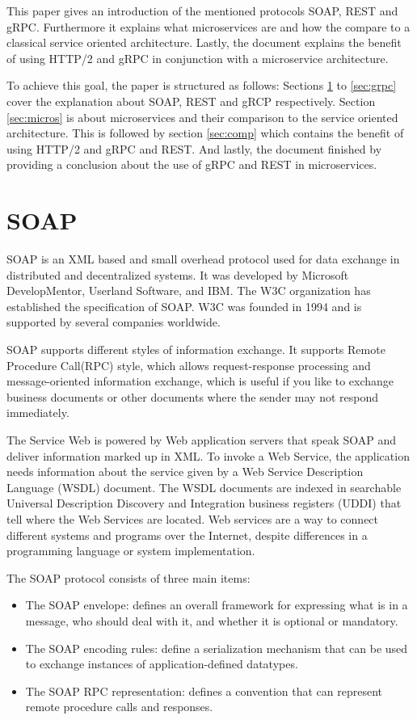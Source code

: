 \documentclass[conference]{IEEEtran}
\begin{document}
This paper gives an introduction of the mentioned protocols SOAP, REST and gRPC. Furthermore it explains what microservices are and how the compare to a classical service oriented architecture. Lastly, the document explains the benefit of using HTTP/2 and gRPC in conjunction with a microservice architecture.

To achieve this goal, the paper is structured as follows: Sections \ref{sec:soap} to \ref{sec:grpc} cover the explanation about SOAP, REST and gRCP respectively. Section \ref{sec:micros} is about microservices and their comparison to the service oriented architecture. This is followed by section \ref{sec:comp} which contains the benefit of using HTTP/2 and gRPC and REST. And lastly, the document finished by providing a conclusion about the use of gRPC and REST in microservices.

\section{SOAP}
\label{sec:soap}

SOAP is an XML based and small overhead protocol used for data exchange in distributed and decentralized systems.
It was developed by Microsoft DevelopMentor, Userland Software, and IBM. The W3C organization has established the specification of SOAP. W3C was founded in 1994 and is supported by several companies worldwide.

SOAP supports different styles of information exchange. It supports Remote Procedure Call(RPC) style, which allows request-response processing and message-oriented information exchange, which is useful if you like to exchange business documents or other documents where the sender may not respond immediately.

The Service Web is powered by Web application servers that speak SOAP and deliver information marked up in XML. To invoke a Web Service, the application needs information about the service given by a Web Service Description Language (WSDL) document. The WSDL documents are indexed in searchable Universal Description Discovery and Integration business registers (UDDI) that tell where the Web Services are located. Web services are a way to connect different systems and programs over the Internet, despite differences in a programming language or system implementation.

The SOAP protocol consists of three main items:

\begin{itemize}
  \item The SOAP envelope: defines an overall framework for expressing what is in a message, who should deal with it, and whether it is optional or mandatory.
  \item The SOAP encoding rules: define a serialization mechanism that can be used to exchange instances of application-defined datatypes.
  \item The SOAP RPC representation: defines a convention that can represent remote procedure calls and responses.
\end{itemize}
\end{document}
